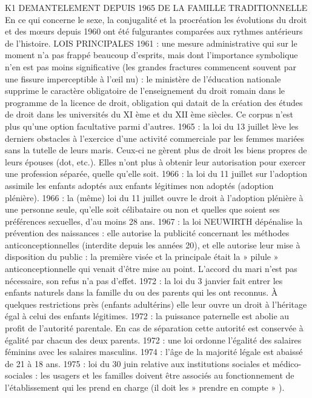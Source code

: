 K1 DEMANTELEMENT DEPUIS 1965 DE LA FAMILLE TRADITIONNELLE
 En ce qui concerne le sexe, la conjugalité et la procréation les évolutions du droit et des mœurs depuis 1960 ont été fulgurantes comparées aux rythmes antérieurs de l'histoire.
 LOIS PRINCIPALES 
 1961 : une mesure administrative qui sur le moment n'a pas frappé beaucoup d'esprits, mais dont l'importance symbolique n'en est pas moins significative (les grandes fractures commencent souvent par une fissure imperceptible à l'œil nu) : le ministère de l'éducation nationale supprime le caractère obligatoire de l'enseignement du droit romain dans le programme de la licence de droit, obligation qui datait de la création des études de droit dans les universités du XI ème et du XII ème siècles. Ce corpus n'est plus qu'une option facultative parmi d'autres. 
 1965 : la loi du 13 juillet lève les derniers obstacles à l'exercice d'une activité commerciale par les femmes mariées sans la tutelle de leurs maris. Ceux-ci ne gèrent plus de droit les biens propres de leurs épouses (dot, etc.). Elles n'ont plus à obtenir leur autorisation pour exercer une profession séparée, quelle qu'elle soit.
 1966 : la loi du 11 juillet sur l'adoption assimile les enfants adoptés aux enfants légitimes non adoptés (adoption plénière). 
 1966 : la (même) loi du 11 juillet ouvre le droit à l'adoption plénière à une personne seule, qu'elle soit célibataire ou non et quelles que soient ses préférences sexuelles, d'au moins 28 ans.
 1967 : la loi NEUWIRTH dépénalise la prévention des naissances : elle autorise la publicité concernant les méthodes anticonceptionnelles (interdite depuis les années 20), et elle autorise leur mise à disposition du public : la première visée et la principale était la » pilule » anticonceptionnelle qui venait d'être mise au point. L'accord du mari n'est pas nécessaire, son refus n'a pas d'effet.
 1972 : la loi du 3 janvier fait entrer les enfants naturels dans la famille du ou des parents qui les ont reconnus. À quelques restrictions près (enfants adultérins) elle leur ouvre un droit à l'héritage égal à celui des enfants légitimes.
 1972 : la puissance paternelle est abolie au profit de l'autorité parentale. En cas de séparation cette autorité est conservée à égalité par chacun des deux parents. 
 1972 : une loi ordonne l'égalité des salaires féminins avec les salaires masculins.
 1974 : l'âge de la majorité légale est abaissé de 21 à 18 ans. 
 1975 : loi du 30 juin relative aux institutions sociales et médico-sociales : les usagers et les familles doivent être associés au fonctionnement de l'établissement qui les prend en charge (il doit les » prendre en compte » ). 
